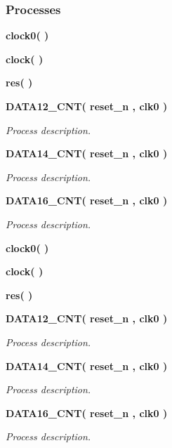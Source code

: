 \subsubsection*{Processes}
 \begin{DoxyCompactItemize}
\item 
{\bf clock0}{\bfseries  (  )}
\item 
{\bf clock}{\bfseries  (  )}
\item 
{\bf res}{\bfseries  (  )}
\item 
{\bf D\+A\+T\+A12\+\_\+\+C\+NT}{\bfseries  ( {\bfseries {\bfseries {\bf reset\+\_\+n}} \textcolor{vhdlchar}{ }} , {\bfseries {\bfseries {\bf clk0}} \textcolor{vhdlchar}{ }} )}
\begin{DoxyCompactList}\small\item\em Process description. \end{DoxyCompactList}\item 
{\bf D\+A\+T\+A14\+\_\+\+C\+NT}{\bfseries  ( {\bfseries {\bfseries {\bf reset\+\_\+n}} \textcolor{vhdlchar}{ }} , {\bfseries {\bfseries {\bf clk0}} \textcolor{vhdlchar}{ }} )}
\begin{DoxyCompactList}\small\item\em Process description. \end{DoxyCompactList}\item 
{\bf D\+A\+T\+A16\+\_\+\+C\+NT}{\bfseries  ( {\bfseries {\bfseries {\bf reset\+\_\+n}} \textcolor{vhdlchar}{ }} , {\bfseries {\bfseries {\bf clk0}} \textcolor{vhdlchar}{ }} )}
\begin{DoxyCompactList}\small\item\em Process description. \end{DoxyCompactList}\item 
{\bf clock0}{\bfseries  (  )}
\item 
{\bf clock}{\bfseries  (  )}
\item 
{\bf res}{\bfseries  (  )}
\item 
{\bf D\+A\+T\+A12\+\_\+\+C\+NT}{\bfseries  ( {\bfseries {\bfseries {\bf reset\+\_\+n}} \textcolor{vhdlchar}{ }} , {\bfseries {\bfseries {\bf clk0}} \textcolor{vhdlchar}{ }} )}
\begin{DoxyCompactList}\small\item\em Process description. \end{DoxyCompactList}\item 
{\bf D\+A\+T\+A14\+\_\+\+C\+NT}{\bfseries  ( {\bfseries {\bfseries {\bf reset\+\_\+n}} \textcolor{vhdlchar}{ }} , {\bfseries {\bfseries {\bf clk0}} \textcolor{vhdlchar}{ }} )}
\begin{DoxyCompactList}\small\item\em Process description. \end{DoxyCompactList}\item 
{\bf D\+A\+T\+A16\+\_\+\+C\+NT}{\bfseries  ( {\bfseries {\bfseries {\bf reset\+\_\+n}} \textcolor{vhdlchar}{ }} , {\bfseries {\bfseries {\bf clk0}} \textcolor{vhdlchar}{ }} )}
\begin{DoxyCompactList}\small\item\em Process description. \end{DoxyCompactList}\end{DoxyCompactItemize}
